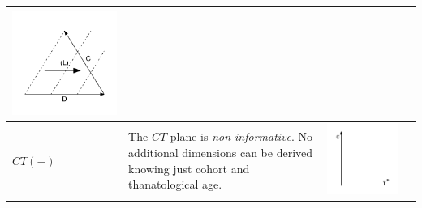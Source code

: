 \documentclass[11pt,oneside,a4paper]{article} %
\begin{document}
\begin{center}
\begin{longtable}{m{}m{}m{}m{}}
  \includegraphics[width = \linewidth]{Figures/JonasTable/CDl_iso.pdf}  \\
  \midrule
  $CT(-)$ &
  The $CT$ plane is \emph{non-informative}. No additional dimensions can be derived knowing just cohort and thanatological age. &
  \includegraphics[width = \linewidth]{Figures/JonasTable/CT.pdf} &

\end{longtable}
\end{center}
\end{document}
